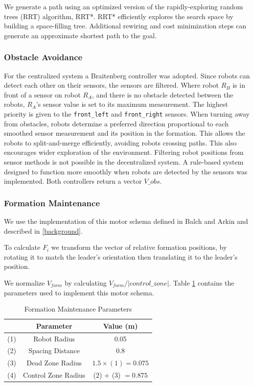 \documentclass[letterpaper, 10 pt, conference]{ieeeconf}  %
\begin{document}
We generate a path using an optimized version of the rapidly-exploring random trees (RRT) algorithm, RRT*. RRT* efficiently explores the search space by building a space-filling tree. Additional rewiring and cost minimization steps can generate an approximate shortest path to the goal. 

\subsubsection*{Obstacle Avoidance}
\label{subsubsection: obs avoid}

For the centralized system a Braitenberg controller was adopted. Since robots can detect each other on their sensors, the sensors are filtered. Where robot $R_B$ is in front of a sensor on robot $R_A$, and there is no obstacle detected between the robots, $R_A$'s sensor value is set to its maximum measurement.
The highest priority is given to the \texttt{front\_left} and \texttt{front\_right} sensors. When turning away from obstacles, robots determine a preferred direction proportional to each smoothed sensor measurement and its position in the formation. This allows the robots to split-and-merge efficiently, avoiding robots crossing paths. This also encourages wider exploration of the environment.
Filtering robot positions from sensor methods is not possible in the decentralized system. A rule-based system designed to function more smoothly when robots are detected by the sensors was implemented.
Both controllers return a vector $V\_obs$.

\subsubsection*{Formation Maintenance}

We use the implementation of this motor schema defined in Balch and Arkin and described in \ref{background}. 

To calculate $F_i$ we transform the vector of relative formation positions, by rotating it to match the leader's orientation then translating it to the leader's position.

We normalize $V_{form}$ by calculating $V_{form}/|control\_zone|$. Table \ref{table_formation} contains the parameters used to implement this motor schema.

\begin{table}[h]
\begin{center}
\begin{tabular}{|c|c|c|}
\hline
& Parameter & Value (m) \\
\hline
(1) & Robot Radius             & 0.05 \\
(2) & Spacing Distance        & 0.8 \\
(3) & Dead Zone Radius      & $1.5 \times (1) = 0.075$ \\
(4) & Control Zone Radius    & (2) $+$ (3) $=0.875$ \\
\hline
\end{tabular}
\end{center}
\caption{Formation Maintenance Parameters}
\label{table_formation}
\end{table}
\end{document}
